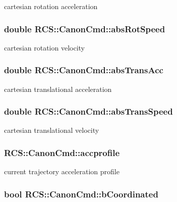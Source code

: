 cartesian rotation acceleration \hypertarget{structRCS_1_1CanonCmd_ad7ce99c4f8d61314aef30c376ace79b7}{
\subsubsection[{abs\-Rot\-Speed}]{\setlength{\rightskip}{0pt plus 5cm}double R\-C\-S\-::\-Canon\-Cmd\-::abs\-Rot\-Speed}}\label{structRCS_1_1CanonCmd_ad7ce99c4f8d61314aef30c376ace79b7}
cartesian rotation velocity \hypertarget{structRCS_1_1CanonCmd_a129e91d931073194c3baaed83f56373e}{
\subsubsection[{abs\-Trans\-Acc}]{\setlength{\rightskip}{0pt plus 5cm}double R\-C\-S\-::\-Canon\-Cmd\-::abs\-Trans\-Acc}}\label{structRCS_1_1CanonCmd_a129e91d931073194c3baaed83f56373e}
cartesian translational acceleration \hypertarget{structRCS_1_1CanonCmd_abac67431174c72bbc8bc1e14916cba60}{
\subsubsection[{abs\-Trans\-Speed}]{\setlength{\rightskip}{0pt plus 5cm}double R\-C\-S\-::\-Canon\-Cmd\-::abs\-Trans\-Speed}}\label{structRCS_1_1CanonCmd_abac67431174c72bbc8bc1e14916cba60}
cartesian translational velocity \hypertarget{structRCS_1_1CanonCmd_a29d47510cc8f459cfa085ef9123bef22}{
\subsubsection[{accprofile}]{ R\-C\-S\-::\-Canon\-Cmd\-::accprofile}}\label{structRCS_1_1CanonCmd_a29d47510cc8f459cfa085ef9123bef22}
current trajectory acceleration profile \hypertarget{structRCS_1_1CanonCmd_abae89c19f08f9011d6e5d3f86e8b6df9}{
\subsubsection[{b\-Coordinated}]{\setlength{\rightskip}{0pt plus 5cm}bool R\-C\-S\-::\-Canon\-Cmd\-::b\-Coordinated}}\label{structRCS_1_1CanonCmd_abae89c19f08f9011d6e5d3f86e8b6df9}
